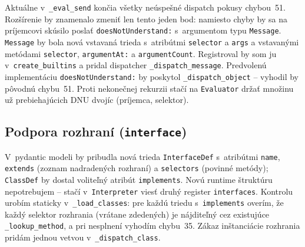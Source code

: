 \documentclass[a4paper, 11pt]{article}
\begin{document}
Aktuálne v~\texttt{\_eval\_send} končia všetky neúspešné dispatch pokusy
chybou~51. Rozšírenie by znamenalo zmeniť len tento jeden bod: namiesto
chyby by sa na príjemcovi skúsilo poslať \texttt{doesNotUnderstand:}
s~argumentom typu \texttt{Message}. \texttt{Message} by bola nová vstavaná
trieda s~atribútmi \texttt{selector} a \texttt{args} a vstavanými metódami
\texttt{selector}, \texttt{argumentAt:} a \texttt{argumentCount}. Registroval
by som ju v~\texttt{create\_builtins} a pridal dispatcher
\texttt{\_dispatch\_message}. Predvolenú implementáciu
\texttt{doesNotUnderstand:} by poskytol \texttt{\_dispatch\_object} --
vyhodil by pôvodnú chybu~51. Proti nekonečnej rekurzii stačí na
\texttt{Evaluator} držať množinu už prebiehajúcich DNU dvojíc
(príjemca, selektor).

\subsection*{Podpora rozhraní (\texttt{interface})}

V~pydantic modeli by pribudla nová trieda \texttt{InterfaceDef} s~atribútmi
\texttt{name}, \texttt{extends} (zoznam nadradených rozhraní) a
\texttt{selectors} (povinné metódy); \texttt{ClassDef} by dostal voliteľný
atribút \texttt{implements}. Novú runtime štruktúru nepotrebujem -- stačí
v~\texttt{Interpreter} viesť druhý register \texttt{interfaces}. Kontrolu
urobím staticky v~\texttt{\_load\_classes}: pre každú triedu s~\texttt{implements}
overím, že každý selektor rozhrania (vrátane zdedených) je nájditeľný cez
existujúce \texttt{\_lookup\_method}, a pri nesplnení vyhodím chybu~35.
Zákaz inštanciácie rozhrania pridám jednou vetvou
v~\texttt{\_dispatch\_class}.
\end{document}
